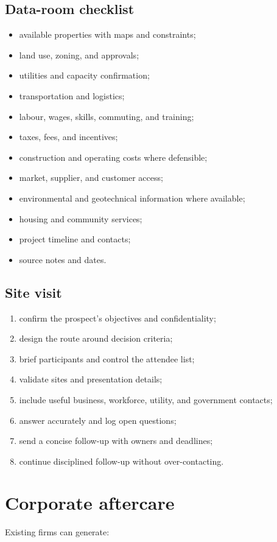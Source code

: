 \documentclass[11pt,letterpaper,oneside,openany]{book}
\begin{document}
\subsection[Data-room checklist]{Data-room checklist}
\begin{itemize}
\item available properties with maps and constraints;
\item land use, zoning, and approvals;
\item utilities and capacity confirmation;
\item transportation and logistics;
\item labour, wages, skills, commuting, and training;
\item taxes, fees, and incentives;
\item construction and operating costs where defensible;
\item market, supplier, and customer access;
\item environmental and geotechnical information where available;
\item housing and community services;
\item project timeline and contacts;
\item source notes and dates.
\end{itemize}


\subsection[Site visit]{Site visit}
\begin{enumerate}
\item confirm the prospect's objectives and confidentiality;
\item design the route around decision criteria;
\item brief participants and control the attendee list;
\item validate sites and presentation details;
\item include useful business, workforce, utility, and government contacts;
\item answer accurately and log open questions;
\item send a concise follow-up with owners and deadlines;
\item continue disciplined follow-up without over-contacting.
\end{enumerate}


\section[Corporate aftercare]{Corporate aftercare}
Existing firms can generate:
\end{document}
